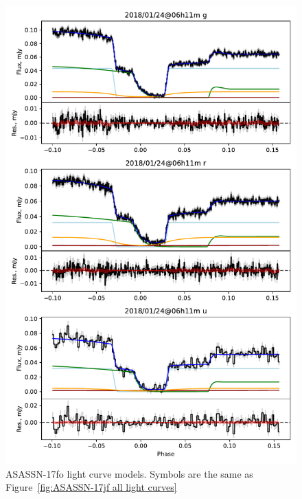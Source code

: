 \begin{figure}
    \centering
    \includegraphics[width=\textwidth]{figures/results/ASASSN-17fo/ASASSN-17fo_1.pdf}
    \caption{ASASSN-17fo light curve models. Symbols are the same as Figure~\ref{fig:ASASSN-17jf all light curves}}
    \label{fig:ASASSN-17fo all light curves}
\end{figure}
